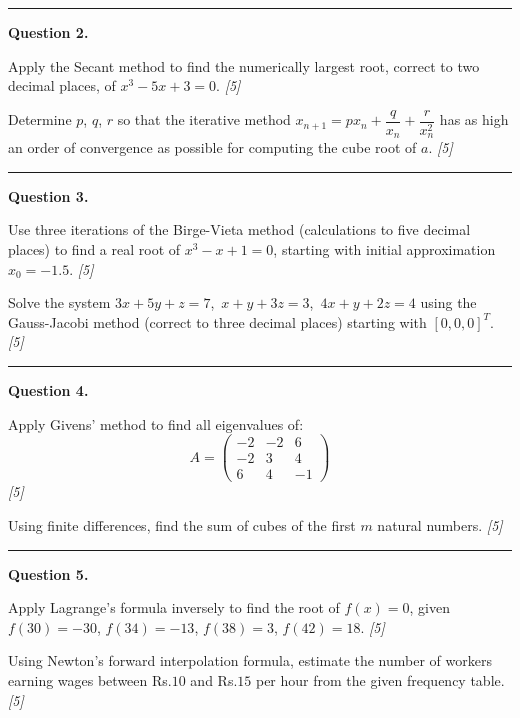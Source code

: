 \documentclass[11pt,a4paper]{article}
\newcommand{\pts}[1]{\hfill   \textit{[#1]}}
\begin{document}
\medskip\rule{\linewidth}{0.2pt}

\medskip


\noindent   \textbf{Question 2.}

\begin{parts}
  \item Apply the Secant method to find the numerically largest root, correct to two decimal places, of $x^3 - 5x + 3 = 0$. \pts{5}
  \item Determine $p$, $q$, $r$ so that the iterative method $x_{n+1} = px_n + \dfrac{q}{x_n} + \dfrac{r}{x_n^2}$ has as high an order of convergence as possible for computing the cube root of $a$. \pts{5}
\end{parts}

\medskip\rule{\linewidth}{0.2pt}

\medskip


\noindent   \textbf{Question 3.}

\begin{parts}
  \item Use three iterations of the Birge-Vieta method (calculations to five decimal places) to find a real root of $x^3 - x + 1 = 0$, starting with initial approximation $x_0 = -1.5$. \pts{5}
  \item Solve the system $3x + 5y + z = 7$,\ $x + y + 3z = 3$,\ $4x + y + 2z = 4$ using the Gauss-Jacobi method (correct to three decimal places) starting with $[0, 0, 0]^T$. \pts{5}
\end{parts}

\medskip\rule{\linewidth}{0.2pt}

\medskip


\noindent   \textbf{Question 4.}

\begin{parts}
  \item Apply Givens' method to find all eigenvalues of:
  \[
  A = 
\begin{pmatrix}-2 & -2 & 6 \\ -2 & 3 & 4 \\ 6 & 4 & -1\end{pmatrix}
  \] \pts{5}
  \item Using finite differences, find the sum of cubes of the first $m$ natural numbers. \pts{5}
\end{parts}

\medskip\rule{\linewidth}{0.2pt}

\medskip


\noindent   \textbf{Question 5.}

\begin{parts}
  \item Apply Lagrange's formula inversely to find the root of $f(x) = 0$, given $f(30) = -30$, $f(34) = -13$, $f(38) = 3$, $f(42) = 18$. \pts{5}
  \item Using Newton's forward interpolation formula, estimate the number of workers earning wages between Rs.$10$ and Rs.$15$ per hour from the given frequency table. \pts{5}
\end{parts}
\end{document}
